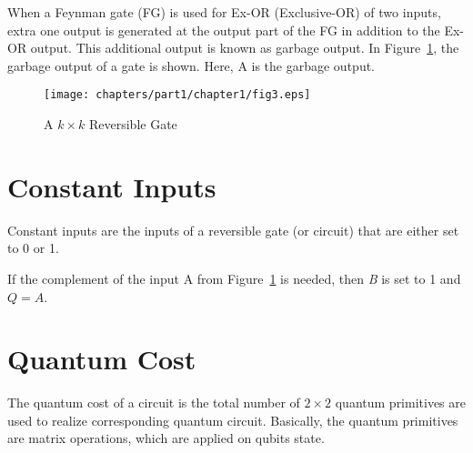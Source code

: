 
\begin{example}\textnormal{
When a Feynman gate (FG) is used for Ex-OR (Exclusive-OR)  of two inputs, extra one output is generated at the output part of the FG in addition to the Ex-OR output. This additional output is known as garbage output. In Figure~\ref{fig:p1_c1_fig3}, the garbage output of a gate is shown. Here, A is the garbage output.}
\end{example}

\begin{figure}[H]
\centering
\texttt{[image: chapters/part1/chapter1/fig3.eps]}
\caption{A $k \times k$ Reversible Gate}
\label{fig:p1_c1_fig3}
\end{figure}

\section{Constant Inputs}
Constant inputs are the inputs of a reversible gate (or circuit) that are either set to 0 or 1.

\begin{example}\textnormal{
If the complement of the input A from Figure~\ref{fig:p1_c1_fig3} is needed, then \textit{B} is set to 1 and $Q = A$.}
\end{example}

\section{Quantum Cost}

The quantum cost of a circuit is the total number of $2 \times 2$ quantum primitives are used to realize corresponding quantum circuit. Basically, the quantum primitives are matrix operations, which are applied on qubits state.%



